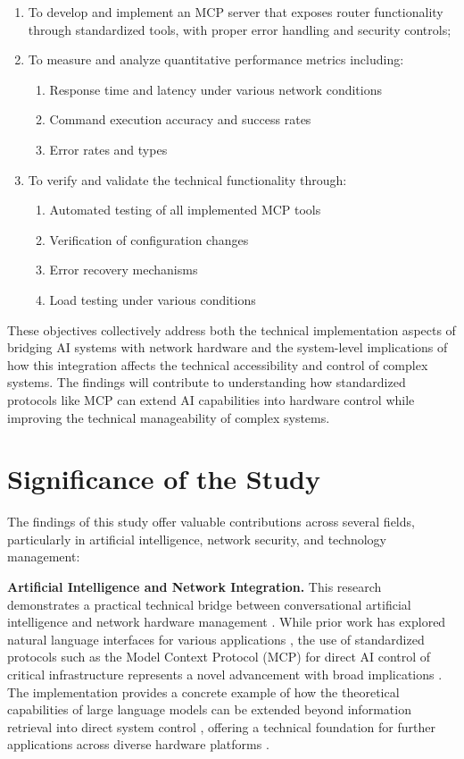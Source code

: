 \begin{enumerate}
\item To develop and implement an MCP server that exposes router functionality through standardized tools, with proper error handling and security controls;

\item To measure and analyze quantitative performance metrics including:
    \begin{enumerate}
        \item Response time and latency under various network conditions
        \item Command execution accuracy and success rates
        \item Error rates and types
    \end{enumerate}

\item To verify and validate the technical functionality through:
    \begin{enumerate}
        \item Automated testing of all implemented MCP tools
        \item Verification of configuration changes
        \item Error recovery mechanisms
        \item Load testing under various conditions
    \end{enumerate}
\end{enumerate}

These objectives collectively address both the technical implementation aspects of bridging AI systems with network hardware and the system-level implications of how this integration affects the technical accessibility and control of complex systems. The findings will contribute to understanding how standardized protocols like MCP can extend AI capabilities into hardware control while improving the technical manageability of complex systems.

\section{Significance of the Study}

The findings of this study offer valuable contributions across several fields, particularly in artificial intelligence, network security, and technology management:

\textbf{Artificial Intelligence and Network Integration.} This research demonstrates a practical technical bridge between conversational artificial intelligence and network hardware management \cite{ai_mediated_interface}. While prior work has explored natural language interfaces for various applications \cite{nlp_cybersecurity}, the use of standardized protocols such as the Model Context Protocol (MCP) for direct AI control of critical infrastructure represents a novel advancement with broad implications \cite{mcp_developer}. The implementation provides a concrete example of how the theoretical capabilities of large language models \cite{llm_reasoning} can be extended beyond information retrieval into direct system control \cite{mcp_intro}, offering a technical foundation for further applications across diverse hardware platforms \cite{vpn_study}.

